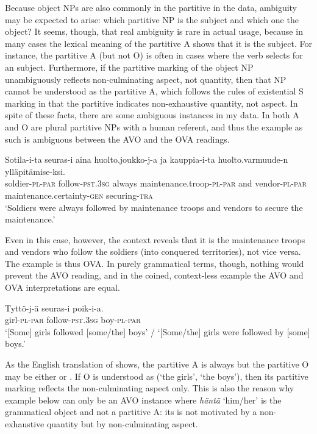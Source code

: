 \documentclass[output=paper]{LSP/langsci}
\begin{document}
Because object NPs are also commonly in the partitive in the data, ambiguity may be expected to arise: which partitive NP is the subject and which one the object? It seems, though, that real ambiguity is rare in actual usage, because in many cases the lexical meaning of the partitive A shows that it is the subject. For instance, the partitive A (but not O) is often  in cases where the verb selects for an  subject. Furthermore, if the partitive marking of the object NP unambiguously reflects non-culminating aspect, not quantity, then that NP cannot be understood as the partitive A, which follows the rules of existential S marking in that the partitive indicates non-exhaustive quantity, not aspect. In spite of these facts, there are some ambiguous instances in my data. In  both A and O are plural partitive NPs with a human referent, and thus the example as such is ambiguous between the AVO and the OVA readings. 

\ea\label{15-hu-ex:26}
\gll Sotila-i-ta seuras-i aina huolto.joukko-j-a ja kauppia-i-ta huolto.varmuude-n ylläpitämise-ksi.\\
soldier-\textsc{pl}-\textsc{par} follow-\textsc{pst}.\textsc{3sg} always maintenance.troop-\textsc{pl}-\textsc{par} and vendor-\textsc{pl}-\textsc{par} maintenance.certainty-\textsc{gen} securing-\textsc{tra}\\
\glt `Soldiers were always followed by maintenance troops and vendors to secure the maintenance.’%
\z

Even in this case, however, the context reveals that it is the maintenance troops and vendors who follow the soldiers (into conquered territories), not vice versa. The example is thus OVA. In purely grammatical terms, though, nothing would prevent the AVO reading, and in the coined, context-less example  the AVO and OVA interpretations are equal.

\ea\label{15-hu-ex:27}
\gll Tyttö-j-ä seuras-i poik-i-a.\\
girl-\textsc{pl}-\textsc{par} follow-\textsc{pst}.\textsc{3sg} boy-\textsc{pl}-\textsc{par}\\
\glt `[Some] girls followed [some/the] boys’ / ‘[Some/the] girls were followed by [some] boys.’
\z

As the English translation of  shows, the partitive A is always  but the partitive O may be either  or . If O is understood as  (‘the girls’, ‘the boys’), then its partitive marking reflects the non-culminating aspect only. This is also the reason why example  below can only be an AVO instance where \textit{häntä} ‘him/her’ is the grammatical object and not a partitive A: its  is not motivated by a non-exhaustive quantity but by non-culminating aspect.
\end{document}
